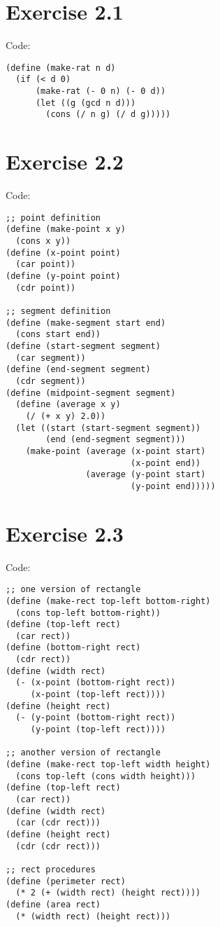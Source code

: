 \documentclass[../main.tex]{subfiles}
\begin{document}
\section{Exercise 2.1}

Code:

\begin{lstlisting}
(define (make-rat n d)
  (if (< d 0)
      (make-rat (- 0 n) (- 0 d))
      (let ((g (gcd n d)))
        (cons (/ n g) (/ d g)))))
\end{lstlisting}

\section{Exercise 2.2}

Code:

\begin{lstlisting}
;; point definition
(define (make-point x y)
  (cons x y))
(define (x-point point)
  (car point))
(define (y-point point)
  (cdr point))

;; segment definition
(define (make-segment start end)
  (cons start end))
(define (start-segment segment)
  (car segment))
(define (end-segment segment)
  (cdr segment))
(define (midpoint-segment segment)
  (define (average x y)
    (/ (+ x y) 2.0))
  (let ((start (start-segment segment))
        (end (end-segment segment)))
    (make-point (average (x-point start)
                         (x-point end))
                (average (y-point start)
                         (y-point end)))))
\end{lstlisting}

\section{Exercise 2.3}

Code:

\begin{lstlisting}
;; one version of rectangle
(define (make-rect top-left bottom-right)
  (cons top-left bottom-right))
(define (top-left rect)
  (car rect))
(define (bottom-right rect)
  (cdr rect))
(define (width rect)
  (- (x-point (bottom-right rect))
     (x-point (top-left rect))))
(define (height rect)
  (- (y-point (bottom-right rect))
     (y-point (top-left rect))))

;; another version of rectangle
(define (make-rect top-left width height)
  (cons top-left (cons width height)))
(define (top-left rect)
  (car rect))
(define (width rect)
  (car (cdr rect)))
(define (height rect)
  (cdr (cdr rect)))

;; rect procedures
(define (perimeter rect)
  (* 2 (+ (width rect) (height rect))))
(define (area rect)
  (* (width rect) (height rect)))
\end{lstlisting}
\end{document}
